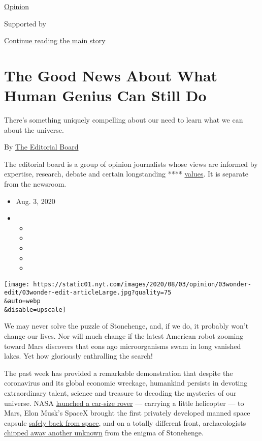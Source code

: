 \href{/section/opinion}{Opinion}

Supported by

\protect\hyperlink{after-sponsor}{Continue reading the main story}

\hypertarget{the-good-news-about-what-human-genius-can-still-do}{%
\section{The Good News About What Human Genius Can Still
Do}\label{the-good-news-about-what-human-genius-can-still-do}}

There's something uniquely compelling about our need to learn what we
can about the universe.

By
\href{https://www.nytimes.com/interactive/opinion/editorialboard.html}{The
Editorial Board}

The editorial board is a group of opinion journalists whose views are
informed by expertise, research, debate and certain longstanding ****
\href{https://www.nytimes.com/interactive/2018/opinion/editorialboard.html}{values}.
It is separate from the newsroom.

\begin{itemize}
\item
  Aug. 3, 2020
\item
  \begin{itemize}
  \item
  \item
  \item
  \item
  \item
  \end{itemize}
\end{itemize}

\texttt{[image: https://static01.nyt.com/images/2020/08/03/opinion/03wonder-edit/03wonder-edit-articleLarge.jpg?quality=75\\\&auto=webp\\\&disable=upscale]}

We may never solve the puzzle of Stonehenge, and, if we do, it probably
won't change our lives. Nor will much change if the latest American
robot zooming toward Mars discovers that eons ago microorganisms swam in
long vanished lakes. Yet how gloriously enthralling the search!

The past week has provided a remarkable demonstration that despite the
coronavirus and its global economic wreckage, humankind persists in
devoting extraordinary talent, science and treasure to decoding the
mysteries of our universe. NASA
\href{https://www.nytimes.com/2020/07/30/science/nasa-mars-launch.html?searchResultPosition=3}{launched
a car-size rover} --- carrying a little helicopter --- to Mars, Elon
Musk's SpaceX brought the first privately developed manned space capsule
\href{https://www.nytimes.com/video/us/100000007269118/spacex-splash-down.html?searchResultPosition=2}{safely
back from space}, and on a totally different front, archaeologists
\href{https://www.nytimes.com/2020/07/29/science/stonehenge-archaeology-sarsens.html?searchResultPosition=1}{chipped
away another unknown} from the enigma of Stonehenge.

